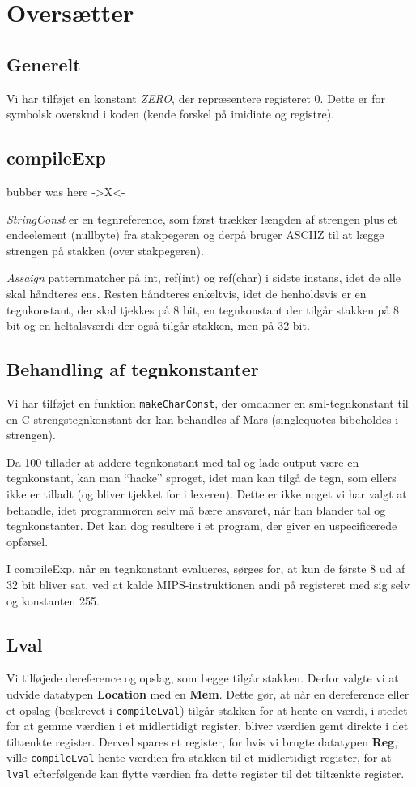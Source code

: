 \documentclass[a4paper, 10pt]{article}
\begin{document}
\section{Oversætter}

\subsection{Generelt}
Vi har tilføjet en konstant \textit{ZERO}, der repræsentere registeret 0. Dette
er for symbolsk overskud i koden (kende forskel på imidiate og registre).


\subsection{compileExp}
bubber was here ->X<-

\textit{StringConst} er en tegnreference, som først trækker længden af strengen
plus et endeelement (nullbyte) fra stakpegeren og derpå bruger ASCIIZ til at
lægge strengen på stakken (over stakpegeren).

\textit{Assaign} patternmatcher på int, ref(int) og ref(char) i sidste instans,
idet de alle skal håndteres ens. Resten håndteres enkeltvis, idet de
henholdsvis er en tegnkonstant, der skal tjekkes på 8 bit, en tegnkonstant
der tilgår stakken på 8 bit og en heltalsværdi der også tilgår
stakken, men på 32 bit.

\subsection{Behandling af tegnkonstanter}
Vi har tilføjet en funktion \texttt{makeCharConst}, der omdanner en
sml-tegnkonstant til en C-strengstegnkonstant der kan behandles af Mars
(singlequotes bibeholdes i strengen).

Da 100 tillader at addere tegnkonstant med tal og lade output være en
tegnkonstant, kan man ``hacke'' sproget, idet man kan tilgå de tegn, som ellers
ikke er tilladt (og bliver tjekket for i lexeren). Dette er ikke noget vi har
valgt at behandle, idet programmøren selv må bære ansvaret, når han blander tal
og tegnkonstanter. Det kan dog resultere i et program, der giver en
uspecificerede opførsel.

I compileExp, når en tegnkonstant evalueres, sørges for, at kun de første 8 ud
af 32 bit bliver sat, ved at kalde MIPS-instruktionen andi på registeret med
sig selv og konstanten 255. 

\subsection{Lval}
Vi tilføjede dereference og opslag, som begge tilgår stakken. Derfor valgte vi
at udvide datatypen \textbf{Location} med en \textbf{Mem}. Dette gør, at når en
dereference eller et opslag (beskrevet i \texttt{compileLval}) tilgår stakken 
for at hente en værdi, i stedet for at gemme værdien i et midlertidigt
register, bliver værdien gemt direkte i det tiltænkte register. Derved spares et
register, for hvis vi brugte datatypen \textbf{Reg}, ville \texttt{compileLval}
hente værdien fra stakken til et midlertidigt register, for at \texttt{lval}
efterfølgende kan flytte værdien fra dette register til det tiltænkte register.
\end{document}
